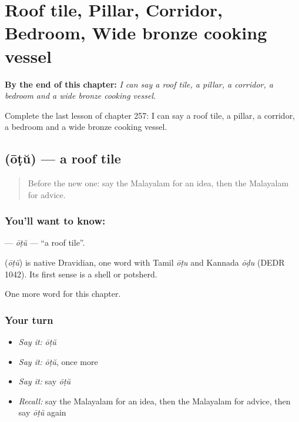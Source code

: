 
\chapter{Roof tile, Pillar, Corridor, Bedroom, Wide bronze cooking vessel}
\label{ch:ml-roof-tile-pillar-corridor-bedroom-wide-bronze-cooking-vessel}

\begin{chapteropening}
\textbf{By the end of this chapter:} \emph{I can say a roof tile, a pillar, a corridor, a bedroom and a wide bronze cooking vessel.}

Complete the last lesson of chapter 257: I can say a roof tile, a pillar, a corridor, a bedroom and a wide bronze cooking vessel.
\end{chapteropening}

\section[\texorpdfstring{\ml{ഓട്} (ōṭŭ)}{ഓട് (ōṭŭ)}]{ (ōṭŭ) — a roof tile}

\label{lesson:ML-C257-otu}



\begin{quote}
Before the new one: say the Malayalam for an idea, then the Malayalam for advice.
\end{quote}

\subsection*{You'll want to know: }
\textbf{} — \emph{ōṭŭ} — \textquotedblleft{}a roof tile\textquotedblright{}.

\begin{cousinweb}
\textbf{} (\emph{ōṭŭ}) is native Dravidian, one word with Tamil \emph{ōṭu} and Kannada \emph{ōḍu} (DEDR 1042). Its first sense is a shell or potsherd.
\end{cousinweb}

\begin{grammarlens}[title={What you've built}]
One more word for this chapter.
\end{grammarlens}

\subsection*{Your turn}
\begin{itemize}
\raggedright
  \item \emph{Say it:} \emph{ōṭŭ}
  \item \emph{Say it:} \emph{ōṭŭ}, once more
  \item \emph{Say it:} say \emph{ōṭŭ}
  \item \emph{Recall:} say the Malayalam for an idea, then the Malayalam for advice, then say \emph{ōṭŭ} again
\end{itemize}

